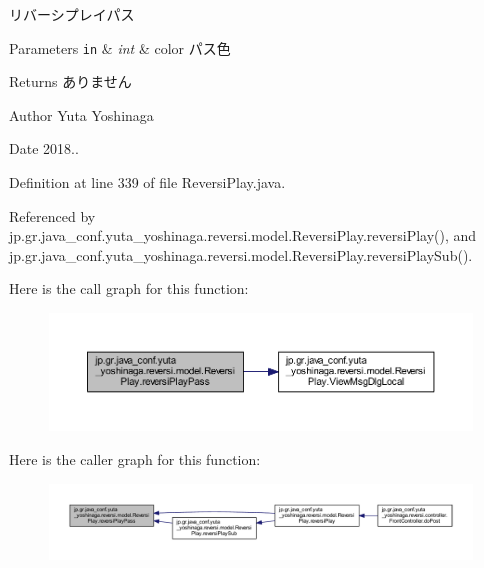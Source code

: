 リバーシプレイパス 


\begin{DoxyParams}[1]{Parameters}
\mbox{\tt in}  & {\em int} & color パス色 \\
\hline
\end{DoxyParams}
\begin{DoxyReturn}{Returns}
ありません 
\end{DoxyReturn}
\begin{DoxyAuthor}{Author}
Yuta Yoshinaga 
\end{DoxyAuthor}
\begin{DoxyDate}{Date}
2018.. 
\end{DoxyDate}


Definition at line 339 of file Reversi\+Play.\+java.



Referenced by jp.\+gr.\+java\+\_\+conf.\+yuta\+\_\+yoshinaga.\+reversi.\+model.\+Reversi\+Play.\+reversi\+Play(), and jp.\+gr.\+java\+\_\+conf.\+yuta\+\_\+yoshinaga.\+reversi.\+model.\+Reversi\+Play.\+reversi\+Play\+Sub().

Here is the call graph for this function\+:
\nopagebreak
\begin{figure}[H]
\begin{center}
\leavevmode
\includegraphics[width=350pt]{classjp_1_1gr_1_1java__conf_1_1yuta__yoshinaga_1_1reversi_1_1model_1_1_reversi_play_acf3c99fcbff26d65f7b12f99d69ab88d_cgraph}
\end{center}
\end{figure}
Here is the caller graph for this function\+:
\nopagebreak
\begin{figure}[H]
\begin{center}
\leavevmode
\includegraphics[width=350pt]{classjp_1_1gr_1_1java__conf_1_1yuta__yoshinaga_1_1reversi_1_1model_1_1_reversi_play_acf3c99fcbff26d65f7b12f99d69ab88d_icgraph}
\end{center}
\end{figure}
\mbox{\label{classjp_1_1gr_1_1java__conf_1_1yuta__yoshinaga_1_1reversi_1_1model_1_1_reversi_play_a6ea2a343ad2fb3ef1317570e87c3fc4f}} 
